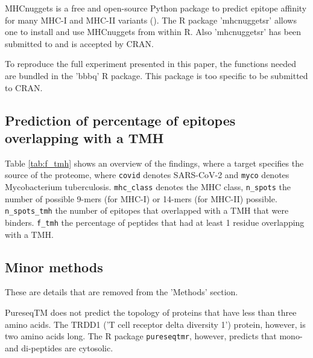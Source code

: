 MHCnuggets is a free and open-source Python package to predict 
epitope affinity for many MHC-I and MHC-II variants (\cite{shao2020high}).
The R package 'mhcnuggetsr' allows one to install and use MHCnuggets
from within R.
Also 'mhcnuggetsr' has been submitted to and is accepted by CRAN.


To reproduce the full experiment presented in this paper,
the functions needed are bundled in the 'bbbq' R package.
This package is too specific to be submitted to CRAN.

\subsection{Prediction of percentage of epitopes overlapping with a TMH}

Table \ref{tab:f_tmh} shows an overview of the findings,
where a target specifies the source of the proteome,
where \verb;covid; denotes SARS-CoV-2 and \verb;myco; denotes
Mycobacterium tuberculosis. \verb;mhc_class; denotes the MHC
class, \verb;n_spots; the number of possible 9-mers (for MHC-I) 
or 14-mers (for MHC-II) possible. \verb;n_spots_tmh; the
number of epitopes that overlapped with a TMH that were binders. 
\verb;f_tmh; the percentage of peptides that had at least 1 residue
overlapping with a TMH.



\subsection{Minor methods}

These are details that are removed from the 'Methods' section.

PureseqTM does not predict the topology
of proteins that have less than three amino acids. 
The TRDD1 ('T cell receptor delta diversity 1') protein,
however, is two amino acids long. 
The R package \verb;pureseqtmr;, however, 
predicts that mono- and di-peptides are cytosolic. 

